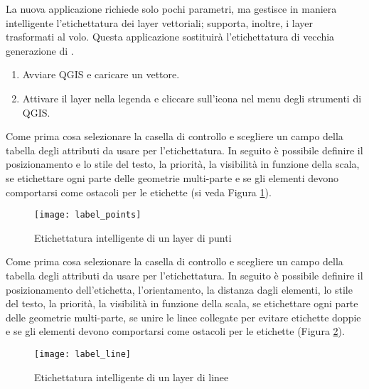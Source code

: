 La nuova applicazione  richiede solo pochi 
parametri, ma gestisce in maniera intelligente l'etichettatura dei layer vettoriali; 
supporta, inoltre, i layer trasformati al volo.
Questa applicazione sostituirà l'etichettatura di vecchia generazione di \qg.


\begin{enumerate}
  \item Avviare QGIS e caricare un vettore.
  \item Attivare il layer nella legenda e cliccare sull'icona  
  nel menu degli strumenti di QGIS.
\end{enumerate}


Come prima cosa selezionare la casella di controllo  e 
scegliere un campo della tabella degli attributi da usare per l'etichettatura. In seguito 
è possibile definire il posizionamento e lo stile del testo, la priorità, la visibilità in funzione 
della scala, se etichettare ogni parte delle geometrie multi-parte e se gli elementi 
devono comportarsi come ostacoli per le etichette (si veda Figura \ref{fig:pointlabel}).

\begin{figure}[ht]
\centering
   \texttt{[image: label\_points]}
   \caption{Etichettatura intelligente di un layer di punti \nixcaption}\label{fig:pointlabel}
\end{figure}


Come prima cosa selezionare la casella di controllo  e 
scegliere un campo della tabella degli attributi da usare per l'etichettatura. In seguito 
è possibile definire il posizionamento dell'etichetta, l'orientamento, la distanza 
dagli elementi, lo stile del testo, la priorità, la visibilità in funzione della scala, 
se etichettare ogni parte delle geometrie multi-parte, se unire le linee collegate per evitare 
etichette doppie e se gli elementi devono comportarsi come ostacoli per le etichette 
(Figura \ref{fig:linelabel}).

\begin{figure}[ht]
\centering
   \texttt{[image: label\_line]}
   \caption{Etichettatura intelligente di un layer di linee \nixcaption}\label{fig:linelabel}
\end{figure}

